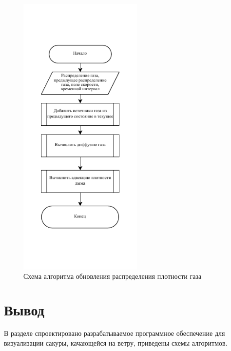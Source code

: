 \begin{figure}[H]
	\centering
	\includegraphics[width=0.55\textwidth, page=1]{assets/img/dens_step.pdf}   
	\caption{Схема алгоритма обновления распределения плотности газа}
	\label{fig:dens_step}
\end{figure}


\section*{Вывод}
В разделе спроектировано разрабатываемое программное обеспечение для визуализации сакуры, качающейся на ветру, приведены схемы алгоритмов.
